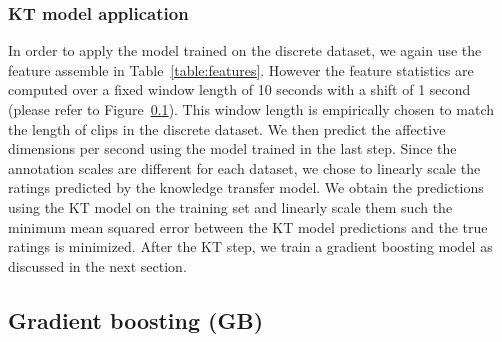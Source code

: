 \documentclass{article}
\begin{document}
\subsubsection{KT model application}
In order to apply the model trained on the discrete dataset, we again use the feature assemble in Table~\ref{table:features}.
However the feature statistics are computed over a fixed window length of 10 seconds with a shift of 1 second (please refer to Figure~\ref{}). 
This window length is empirically chosen to match the length of clips in the discrete dataset.
We then predict the affective dimensions per second using the model trained in the last step.
Since the annotation scales are different for each dataset, we chose to linearly scale the ratings predicted by the knowledge transfer model.
We obtain the predictions using the KT model on the training set and linearly scale them such the minimum mean squared error between the KT model predictions and the true ratings is minimized. 
After the KT step, we train a gradient boosting model as discussed in the next section. 


\subsection{Gradient boosting (GB)}

\end{document}
